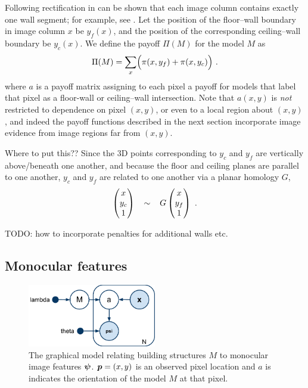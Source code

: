 \documentclass{article}
\newcommand\Payoff{\Pi}
\newcommand\ColPayoff{\pi}
\newcommand\Model{M}
\newcommand\Feature{\vect{\psi}}
\newcommand\Pixel{\vect{p}}
\begin{document}
Following rectification in can be shown that each image column
contains exactly one wall segment; for example, see
. Let the position of the floor--wall boundary in
image column $x$ be $y_f(x)$, and the position of the corresponding
ceiling--wall boundary be $y_c(x)$. We define the payoff
$\Payoff(\Model)$ for the model $\Model$ as
\begin{equation}
  \label{eq:abstract-payoffs}
  \Payoff(\Model) = \sum_x \Bigl(\ColPayoff(x,y_f) +
  \ColPayoff(x,y_c)\Bigr) ~.
\end{equation}
where $a$ is a payoff matrix assigning to each pixel a payoff for
models that label that pixel as a floor-wall or ceiling--wall
intersection. Note that $a(x,y)$ is \textit{not} restricted to
dependence on pixel $(x,y)$, or even to a local region about $(x,y)$,
and indeed the payoff functions described in the next section
incorporate image evidence from image regions far from $(x,y)$.

Where to put this?? Since the 3D points corresponding to $y_c$ and
$y_f$ are vertically above/beneath one another, and because the floor
and ceiling planes are parallel to one another, $y_c$ and $y_f$ are
related to one another via a planar homology\cite{Criminisi01} $G$,
\begin{equation}
  \begin{pmatrix} x \\ y_c \\ 1 \end{pmatrix}
  \hspace{0.3cm} \sim \hspace{0.3cm}
  G \begin{pmatrix} x \\ y_f \\ 1 \end{pmatrix}
  ~.
\end{equation}

TODO: how to incorporate penalties for additional walls etc.

\subsection{Monocular features}

\begin{figure}[tb]
  \centering
  \includegraphics[width=0.5\textwidth]{figures/monocular-gm}
  \caption{The graphical model relating building structures $M$ to
    monocular image features $\Feature$. $\Pixel=(x,y)$ is an observed
    pixel location and $a$ is indicates the orientation of the model
    $M$ at that pixel.}
  \label{fig:monocular-gm}
\end{figure}
\end{document}
